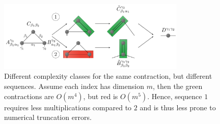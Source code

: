 \begin{figure}
    \centering
    \includegraphics[width=0.8\textwidth]{figures/ComplexContraction1.pdf}
    \caption{Different complexity classes for the same contraction, but different sequences. Assume each index has dimension $m$, then the green contractions are $O(m^4)$, but red is $O(m^5)$. Hence, sequence $1$ requires less multiplications compared to $2$ and is thus less prone to numerical truncation errors.}
    \label{fig:contraction_sequences}
\end{figure}

